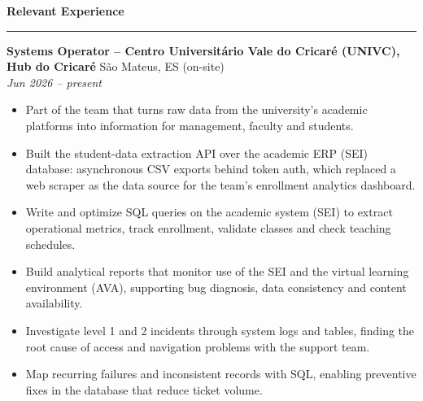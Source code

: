 \documentclass[a4paper,10pt]{article}
\newcommand{\sectiontitle}[1]{\needspace{5\baselineskip}\vspace{6pt}\noindent\textbf{\large #1}\vspace{3pt}\hrule\vspace{6pt}}
\begin{document}
	\sectiontitle{Relevant Experience}

	\textbf{Systems Operator -- Centro Universitário Vale do Cricaré (UNIVC), Hub do Cricaré} \hfill São Mateus, ES (on-site)\\
	\textit{Jun 2026 -- present}
	\begin{itemize}
		\item Part of the team that turns raw data from the university's academic platforms into information for management, faculty and students.
		\item Built the student-data extraction API over the academic ERP (SEI) database: asynchronous CSV exports behind token auth, which replaced a web scraper as the data source for the team's enrollment analytics dashboard.
		\item Write and optimize SQL queries on the academic system (SEI) to extract operational metrics, track enrollment, validate classes and check teaching schedules.
		\item Build analytical reports that monitor use of the SEI and the virtual learning environment (AVA), supporting bug diagnosis, data consistency and content availability.
		\item Investigate level 1 and 2 incidents through system logs and tables, finding the root cause of access and navigation problems with the support team.
		\item Map recurring failures and inconsistent records with SQL, enabling preventive fixes in the database that reduce ticket volume.
	\end{itemize}
\end{document}
